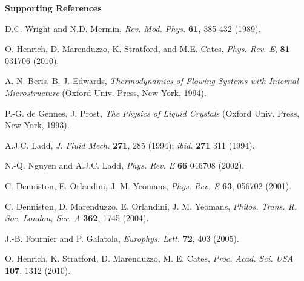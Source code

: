\documentclass[12pt,twoside]{article}
\begin{document}
\newpage

{\bf Supporting References}

\begin{thebibliography}{99}

D.C. Wright and N.D. Mermin,
{\it Rev. Mod. Phys.} {\bf 61,} 385-432 (1989).




O. Henrich, D. Marenduzzo, K. Stratford, and M.E. Cates,
\textit{Phys. Rev. E}, \textbf{81} 031706 (2010).

A. N. Beris, B. J. Edwards, 
{\it Thermodynamics of Flowing Systems with Internal Microstructure}
(Oxford Univ. Press, New York, 1994).

P.-G. de Gennes, J. Prost,
{\it The Physics of Liquid Crystals} (Oxford Univ. Press, New York, 1993).

A.J.C. Ladd,
\textit{J. Fluid Mech.} \textbf{271}, 285 (1994); \textit{ibid.} \textbf{271}
311 (1994).

N.-Q. Nguyen and A.J.C. Ladd,
\textit{Phys. Rev. E} \textbf{66} 046708 (2002).

C. Denniston, E. Orlandini, J. M. Yeomans, 
\textit{Phys. Rev. E} \textbf{63}, 056702 (2001).

C. Denniston, D. Marenduzzo, E. Orlandini, J. M.  Yeomans, 
\textit{Philos. Trans. R. Soc. London, Ser. A} \textbf{362}, 1745 (2004).

J.-B. Fournier and P. Galatola,
\textit{Europhys. Lett.} \textbf{72}, 403 (2005).

O. Henrich, K. Stratford, D. Marenduzzo, M. E. Cates, 
\textit{Proc. Acad. Sci. USA} \textbf{107}, 1312 (2010).

\end{thebibliography}
\end{document}
